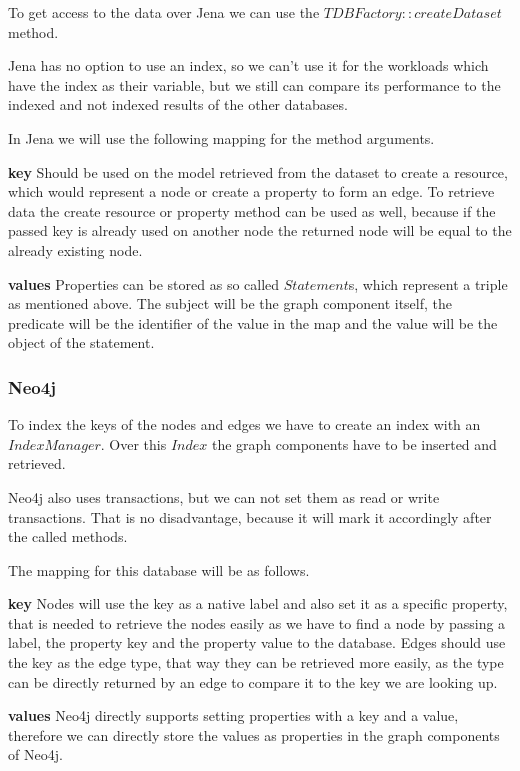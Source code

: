 To get access to the data over Jena we can use the $ TDBFactory::createDataset $ method.

Jena has no option to use an index,
so we can't use it for the workloads which have the index as their variable,
but we still can compare its performance to the indexed and not indexed results of the other databases.

In Jena we will use the following mapping for the method arguments.

\textbf{key} \newline
Should be used on the model retrieved from the dataset to create a resource,
which would represent a node or create a property to form an edge.
To retrieve data the create resource or property method can be used as well,
because if the passed key is already used on another node the returned node will be equal to the already existing node.

\textbf{values} \newline
Properties can be stored as so called $ Statement $s,
which represent a triple as mentioned above.
The subject will be the graph component itself,
the predicate will be the identifier of the value in the map and the value will be the object of the statement.

\subsubsection{Neo4j}
To index the keys of the nodes and edges we have to create an index with an $ Index Manager $.
Over this $ Index $ the graph components have to be inserted and retrieved.

Neo4j also uses transactions,
but we can not set them as read or write transactions.
That is no disadvantage,
because it will mark it accordingly after the called methods.

The mapping for this database will be as follows.

\textbf{key} \newline
Nodes will use the key as a native label and also set it as a specific property,
that is needed to retrieve the nodes easily as we have to find a node by passing a label, the property key and the property value to the database.
Edges should use the key as the edge type,
that way they can be retrieved more easily,
as the type can be directly returned by an edge to compare it to the key we are looking up.

\textbf{values} \newline
Neo4j directly supports setting properties with a key and a value,
therefore we can directly store the values as properties in the graph components of Neo4j.

